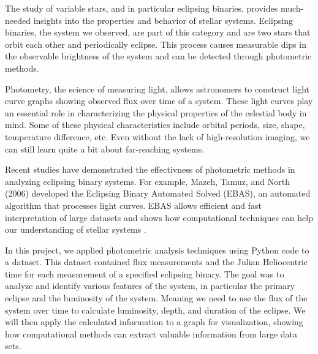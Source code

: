 The study of variable stars, and in particular eclipsing binaries, provides much-needed insights
into the properties and behavior of stellar systems. Eclipsing binaries, the system we observed,
are part of this category and are two stars that orbit each other and periodically eclipse.
This process causes measurable dips in the observable brightness of the system and can be
detected through photometric methods.

Photometry, the science of measuring light, allows astronomers to construct light curve graphs
showing observed flux over time of a system. These light curves play an essential role in
characterizing the physical properties of the celestial body in mind. Some of these physical
characteristics include orbital periods, size, shape, temperature difference, etc. Even without
the lack of high-resolution imaging, we can still learn quite a bit about far-reaching systems.

Recent studies have demonstrated the effectivness of photometric methods in analyzing 
eclipsing binary systems. For example, Mazeh, Tamuz, and North (2006) developed the 
Eclipsing Binary Automated Solved (EBAS), an automated algorithm that processes light curves.
EBAS allows efficient and fast interpretation of large datasets and shows how computational 
techniques can help our understanding of stellar systems \cite{mazeh2006automated}.

In this project, we applied photometric analysis techniques using Python code to a dataset. This
dataset contained flux measurements and the Julian Heliocentric time for each measurement of a
specified eclipsing binary. The goal was to analyze and identify various features of the system,
in particular the primary eclipse and the luminosity of the system. Meaning we need to use the flux
of the system over time to calculate luminosity, depth, and duration of the eclipse. We will then
apply the calculated information to a graph for visualization, showing how computational methods
can extract valuable information from large data sets.

